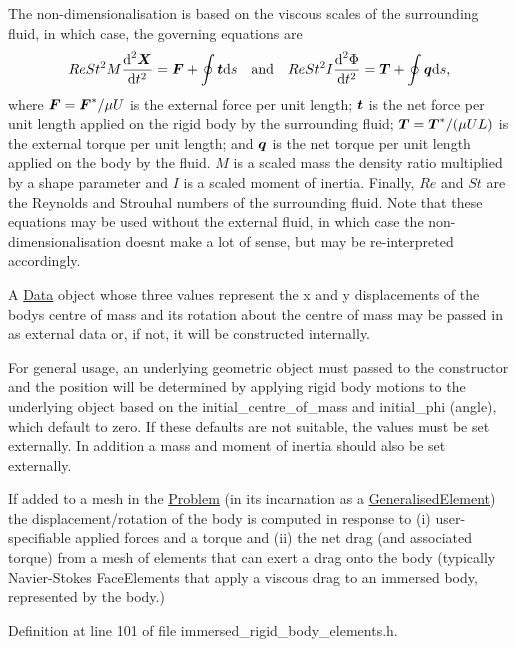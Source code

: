 The non-\/dimensionalisation is based on the viscous scales of the surrounding fluid, in which case, the governing equations are \[ Re St^{2} M \frac{\mbox{d}^{2} \mbox{\boldmath$X$}}{\mbox{d} t^{2}} = \mbox{\boldmath$F$} + \oint \mbox{\boldmath$t$} \mbox{d} s \quad\mbox{and}\quad Re St^{2} I \frac{\mbox{d}^{2}\Phi}{\mbox{d} t^{2}} = \mbox{\boldmath$T$} + \oint \mbox{\boldmath$q$} \mbox{d} s, \] where $\mbox{\boldmath$F$} = \mbox{\boldmath$F$}^{*}/\mu U$ is the external force per unit length; $\mbox{\boldmath$t$}$ is the net force per unit length applied on the rigid body by the surrounding fluid; $\mbox{\boldmath$T$} = \mbox{\boldmath$T$}^{*}/(\mu UL)$ is the external torque per unit length; and $\mbox{\boldmath$q$}$ is the net torque per unit length applied on the body by the fluid. $M$ is a scaled mass the density ratio multiplied by a shape parameter and $I$ is a scaled moment of inertia. Finally, $Re$ and $St$ are the Reynolds and Strouhal numbers of the surrounding fluid. Note that these equations may be used without the external fluid, in which case the non-\/dimensionalisation doesn\textquotesingle{}t make a lot of sense, but may be re-\/interpreted accordingly.

A \hyperlink{classoomph_1_1Data}{Data} object whose three values represent the x and y displacements of the body\textquotesingle{}s centre of mass and its rotation about the centre of mass may be passed in as external data or, if not, it will be constructed internally.

For general usage, an underlying geometric object must passed to the constructor and the position will be determined by applying rigid body motions to the underlying object based on the initial\+\_\+centre\+\_\+of\+\_\+mass and initial\+\_\+phi (angle), which default to zero. If these defaults are not suitable, the values must be set externally. In addition a mass and moment of inertia should also be set externally.

If added to a mesh in the \hyperlink{classoomph_1_1Problem}{Problem} (in its incarnation as a \hyperlink{classoomph_1_1GeneralisedElement}{Generalised\+Element}) the displacement/rotation of the body is computed in response to (i) user-\/specifiable applied forces and a torque and (ii) the net drag (and associated torque) from a mesh of elements that can exert a drag onto the body (typically Navier-\/\+Stokes Face\+Elements that apply a viscous drag to an immersed body, represented by the body.) 

Definition at line 101 of file immersed\+\_\+rigid\+\_\+body\+\_\+elements.\+h.



